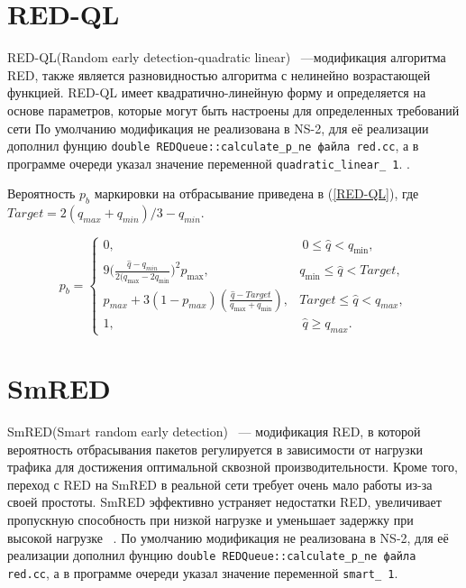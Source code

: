 \section{RED-QL}
\label{chap2:sec8}

RED-QL(Random early detection-quadratic linear) ~---модификация алгоритма RED, также является разновидностью алгоритма с нелинейно возрастающей функцией. RED-QL имеет квадратично-линейную форму и определяется на основе параметров, которые могут быть настроены для определенных требований сети\cite{REDQL} По умолчанию модификация не реализована в NS-2, для её реализации дополнил фунцию \verb|double REDQueue::calculate_p_ne файла red.cc|, а в программе очереди указал значение переменной \verb|quadratic_linear_ 1|. . 

Вероятность $p_{b}$ маркировки на отбрасывание приведена в (\ref{RED-QL}), где $ Target = 2(q_{max} + q_{min})/3 - q_{min} $.

\begin{equation}
\label{RED-QL}
p_{b} = \begin{cases}
        0, &  \ 0 \leqslant \hat{q} < q_{\min},
        \\
        9({\frac{\hat{q} - q_{min}}{2(q_{\max} - 2q_{\min}})^2} {p_{\max}}, &  q_{\min} \leqslant  \hat{q} < {Target},
        \\
        p_{max} + 3(1-p_{max}) (\frac{\hat{q} - Target}{q_{\max} + q_{\min}}), & {Target} \leqslant  \hat{q} < q_{max},
        \\
        1, &  \ \hat{q} \geqslant q_{max}.
\end{cases}
\end{equation}

\section{SmRED}
\label{chap2:sec9}

SmRED(Smart random early detection) ~--- модификация RED, в которой
вероятность отбрасывания пакетов регулируется в зависимости от нагрузки трафика для достижения оптимальной сквозной производительности.
Кроме того, переход с RED на SmRED в реальной сети требует очень мало работы из-за своей простоты. SmRED эффективно устраняет недостатки
RED, увеличивает пропускную способность при низкой нагрузке и уменьшает задержку при высокой нагрузке ~\cite{SmRED}. По умолчанию модификация не реализована в NS-2, для её реализации дополнил фунцию \verb|double REDQueue::calculate_p_ne файла red.cc|, а в программе очереди указал значение переменной \verb|smart_ 1|. 

